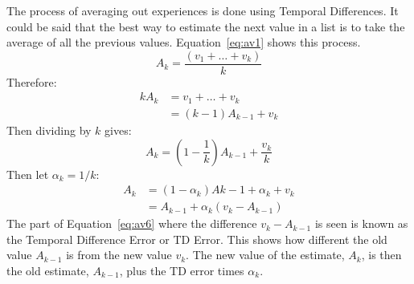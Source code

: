 The process of averaging out experiences is done using Temporal Differences. It could be said that the best way to estimate the next value in a list is to take the average of all the previous values. Equation~\ref{eq:av1} shows this process.
\begin{equation}\label{eq:av1}
A_{k} = \frac{(v_{1}+\dots+v_{k})}{k}
\end{equation}
Therefore:
\begin{eqnarray}\label{eq:av3}
kA_{k} &= v_{1}+\dots+v_{k}\nonumber \\
 &= (k-1)A_{k-1}+v_{k}
\end{eqnarray}
Then dividing by $k$ gives:
\begin{equation}\label{eq:av4}
A_{k}=(1-\frac{1}{k})A_{k-1}+\frac{v_{k}}{k}
\end{equation}
Then let $\alpha _{k}=1/k$:
\begin{eqnarray}\label{eq:av6}
A_{k} &= (1-\alpha _{k})A{k-1}+\alpha _{k} + v_{k}\nonumber \\
&= A_{k-1} + \alpha _{k}(v_{k}-A_{k-1})
\end{eqnarray}
The part of Equation~\ref{eq:av6} where the difference $v_{k}-A_{k-1}$ is seen is known as the Temporal Difference Error or TD Error. This shows how different the old value $A_{k-1}$ is from the new value $v_{k}$. The new value of the estimate, $A_{k}$, is then the old estimate, $A_{k-1}$, plus the TD error times $\alpha _{k}$.

